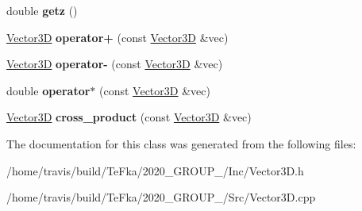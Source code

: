 \begin{DoxyCompactItemize}
\item 
double {\bfseries getz} ()\hypertarget{class_vector3_d_ab69939399a0e1d5b438d7ce0bfc7b0a0}{}\label{class_vector3_d_ab69939399a0e1d5b438d7ce0bfc7b0a0}

\item 
\hyperlink{class_vector3_d}{Vector3D} {\bfseries operator+} (const \hyperlink{class_vector3_d}{Vector3D} \&vec)\hypertarget{class_vector3_d_a4cd00277b6c9701aeeaab5fa7b744c26}{}\label{class_vector3_d_a4cd00277b6c9701aeeaab5fa7b744c26}

\item 
\hyperlink{class_vector3_d}{Vector3D} {\bfseries operator-\/} (const \hyperlink{class_vector3_d}{Vector3D} \&vec)\hypertarget{class_vector3_d_ac61ff2094b3f508af31eed2e2c51136d}{}\label{class_vector3_d_ac61ff2094b3f508af31eed2e2c51136d}

\item 
double {\bfseries operator$\ast$} (const \hyperlink{class_vector3_d}{Vector3D} \&vec)\hypertarget{class_vector3_d_a092e054a30060ab9d95cf1c8a9121e2a}{}\label{class_vector3_d_a092e054a30060ab9d95cf1c8a9121e2a}

\item 
\hyperlink{class_vector3_d}{Vector3D} {\bfseries cross\+\_\+product} (const \hyperlink{class_vector3_d}{Vector3D} \&vec)\hypertarget{class_vector3_d_a9788b8a0f2deeb37bee08a6df7b1e94d}{}\label{class_vector3_d_a9788b8a0f2deeb37bee08a6df7b1e94d}

\end{DoxyCompactItemize}


The documentation for this class was generated from the following files\+:\begin{DoxyCompactItemize}
\item 
/home/travis/build/\+Te\+Fka/2020\+\_\+\+G\+R\+O\+U\+P\+\_/\+Inc/Vector3\+D.\+h\item 
/home/travis/build/\+Te\+Fka/2020\+\_\+\+G\+R\+O\+U\+P\+\_/\+Src/Vector3\+D.\+cpp\end{DoxyCompactItemize}
